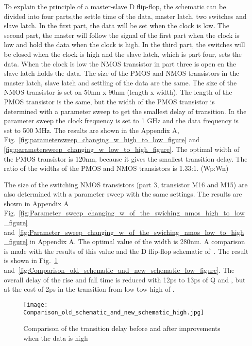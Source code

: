 To explain the principle of a master-slave D flip-flop, the schematic can be divided into four parts,the settle time of the data, master latch, two switches and slave latch. In the first part, the data will be set when the clock is low. The second part, the master will follow the signal of the first part when the clock is low and hold the data when the clock is high. In the third part, the switches will be closed when the clock is high and the slave latch, which is part four, sets the data. When the clock is low the NMOS transistor in part three is open en the slave latch holds the data. 
The size of the PMOS and NMOS transistors in the master latch, slave latch and settling of the data are the same. The size of the NMOS transistor is set on 50nm x 90nm (length x width). The length of the PMOS transistor is the same, but the width of the PMOS transistor is determined with a parameter sweep to get the smallest delay of transition. In the parameter sweep the clock frequency is set to 1 GHz and the data frequency is set to 500 MHz. The results are shown in the Appendix A, Fig.~\ref{fig:parametersweep_changing_w_high_to_low_figure} and \ref{fig:parametersweep_changing_w_low_to_high_figure}. The optimal width of the PMOS transistor is 120nm, because it gives the smallest transition delay. The ratio of the widths of the PMOS and NMOS transistors is 1.33:1. (Wp:Wn)

The size of the switching NMOS transistors (part 3, transistor M16 and M15) are also determined with a parameter sweep with the same settings. The results are shown in Appendix A Fig.~\ref{fig:Parameter_sweep_changing_w_of_the_swiching_nmos_high_to_low_figure} and~\ref{fig:Parameter_sweep_changing_w_of_the_swiching_nmos_low_to_high_figure} in Appendix A. The optimal value of the width is 280nm. A comparison is made with the results of this value and the D flip-flop schematic of~\cite{powerdac}. The result is shown in Fig.~\ref{fig:Comparison_old_schematic_and_new_schematic_high_figure} and~\ref{fig:Comparison_old_schematic_and_new_schematic_low_figure}. The overall delay of the rise and fall time is reduced with 12ps to 13ps of Q and , but at the cost of 2ps in the transition from low tow high of . 

\begin{figure}[h]
\texttt{[image: Comparison\_old\_schematic\_and\_new\_schematic\_high.jpg]}
\caption{Comparison of the transition delay before and after improvements when the data is high }
\label{fig:Comparison_old_schematic_and_new_schematic_high_figure}
\end{figure}

